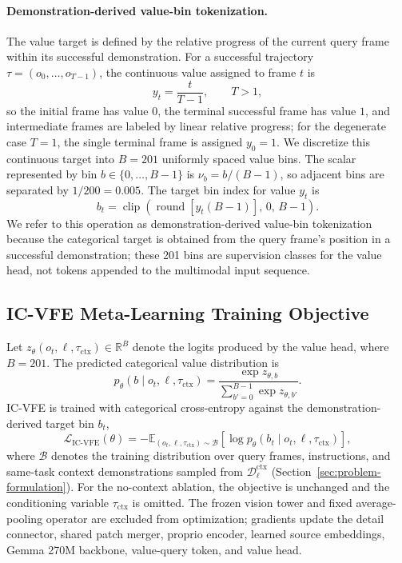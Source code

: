 \paragraph{Demonstration-derived value-bin tokenization.} The value target is defined
by the relative progress of the current query frame within its successful
demonstration. For a successful trajectory $\tau = (o_0, \dots, o_{T-1})$, the
continuous value assigned to frame $t$ is
\begin{equation}
    y_t = \frac{t}{T-1}, \qquad T > 1 ,
\end{equation}
so the initial frame has value $0$, the terminal successful frame has value $1$, and
intermediate frames are labeled by linear relative progress; for the degenerate case
$T=1$, the single terminal frame is assigned $y_0 = 1$. We discretize this continuous
target into $B = 201$ uniformly spaced value bins. The scalar represented by bin $b
\in \{0, \dots, B-1\}$ is $\nu_b = b / (B-1)$, so adjacent bins are separated by
$1/200 = 0.005$. The target bin index for value $y_t$ is
\begin{equation}
    b_t = \operatorname{clip}\left(
        \operatorname{round}\left[y_t (B-1)\right],\, 0,\, B-1
    \right) .
\end{equation}
We refer to this operation as demonstration-derived value-bin tokenization because the
categorical target is obtained from the query frame's position in a successful
demonstration; these 201 bins are supervision classes for the value head, not tokens
appended to the multimodal input sequence.

\subsection{IC-VFE Meta-Learning Training Objective}
\label{sec:ic-vfe-objective}

Let $z_\theta(o_t, \ell, \tau_{\text{ctx}}) \in \mathbb{R}^{B}$ denote the logits
produced by the value head, where $B = 201$. The predicted categorical value
distribution is
\begin{equation}
    p_\theta(b \mid o_t, \ell, \tau_{\text{ctx}})
    = \frac{\exp z_{\theta, b}}{\sum_{b'=0}^{B-1} \exp z_{\theta, b'}} .
\end{equation}
IC-VFE is trained with categorical cross-entropy against the demonstration-derived
target bin $b_t$,
\begin{equation}
    \mathcal{L}_{\mathrm{IC\text{-}VFE}}(\theta)
    = -\mathbb{E}_{(o_t, \ell, \tau_{\text{ctx}}) \sim \mathcal{B}}
    \left[\log p_\theta(b_t \mid o_t, \ell, \tau_{\text{ctx}})\right] ,
\end{equation}
where $\mathcal{B}$ denotes the training distribution over query frames, instructions,
and same-task context demonstrations sampled from $\mathcal{D}_\ell^{\text{ctx}}$
(Section~\ref{sec:problem-formulation}). For the no-context ablation, the objective is
unchanged and the conditioning variable $\tau_{\text{ctx}}$ is omitted. The frozen
vision tower and fixed average-pooling operator are excluded from optimization;
gradients update the detail connector, shared patch merger, proprio encoder, learned
source embeddings, Gemma 270M backbone, value-query token, and value head.

